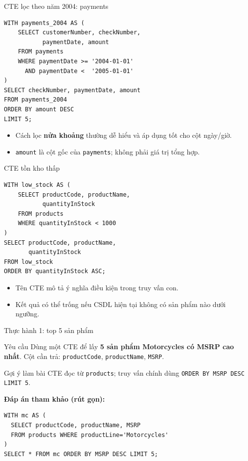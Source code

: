 \documentclass[aspectratio=169,10pt]{beamer}
\newcommand{\code}[1]{\texttt{#1}}
\begin{document}
\begin{frame}[fragile]{CTE lọc theo năm 2004: payments}
\small
\begin{lstlisting}[basicstyle=\ttfamily\scriptsize]
WITH payments_2004 AS (
    SELECT customerNumber, checkNumber,
           paymentDate, amount
    FROM payments
    WHERE paymentDate >= '2004-01-01'
      AND paymentDate <  '2005-01-01'
)
SELECT checkNumber, paymentDate, amount
FROM payments_2004
ORDER BY amount DESC
LIMIT 5;
\end{lstlisting}
\vspace{.1em}
\begin{itemize}
\item Cách lọc \textbf{nửa khoảng} thường dễ hiểu và áp dụng tốt cho cột ngày/giờ.
\item \code{amount} là cột gốc của \code{payments}; không phải giá trị tổng hợp.
\end{itemize}
\end{frame}

\begin{frame}[fragile]{CTE tồn kho thấp}
\small
\begin{lstlisting}[basicstyle=\ttfamily\scriptsize]
WITH low_stock AS (
    SELECT productCode, productName,
           quantityInStock
    FROM products
    WHERE quantityInStock < 1000
)
SELECT productCode, productName,
       quantityInStock
FROM low_stock
ORDER BY quantityInStock ASC;
\end{lstlisting}
\vspace{.1em}
\begin{itemize}
\item Tên CTE mô tả ý nghĩa điều kiện trong truy vấn con.
\item Kết quả có thể trống nếu CSDL hiện tại không có sản phẩm nào dưới ngưỡng.
\end{itemize}
\end{frame}

\begin{frame}[fragile]{Thực hành 1: top 5 sản phẩm}
\begin{block}{Yêu cầu}
Dùng một CTE để lấy \textbf{5 sản phẩm Motorcycles có MSRP cao nhất}. Cột cần trả: \code{productCode}, \code{productName}, \code{MSRP}.
\end{block}
\begin{alertblock}{Gợi ý làm bài}
CTE đọc từ \code{products}; truy vấn chính dùng \code{ORDER BY MSRP DESC LIMIT 5}.
\end{alertblock}
\textbf{Đáp án tham khảo (rút gọn):}
\begin{lstlisting}[basicstyle=\ttfamily\scriptsize]
WITH mc AS (
  SELECT productCode, productName, MSRP
  FROM products WHERE productLine='Motorcycles'
)
SELECT * FROM mc ORDER BY MSRP DESC LIMIT 5;
\end{lstlisting}
\end{frame}
\end{document}
